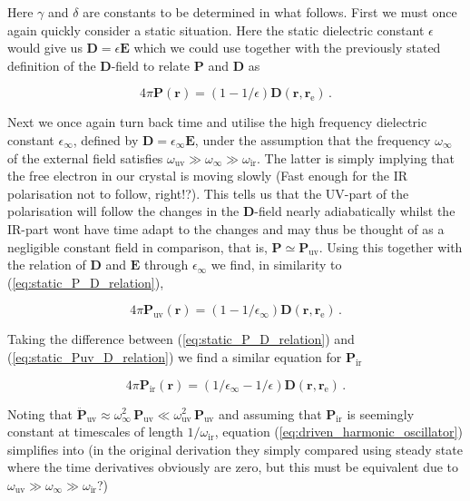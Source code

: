 \documentclass[12pt]{report}
\renewcommand{\vec}[1]{\boldsymbol{\mathbf{#1}}}                        %
\newcommand{\motivation}[1]{\textcolor{motivation}{#1}}
\begin{document}
Here $ \gamma $ and $ \delta $ are constants to be determined in what follows. First we must once again quickly consider a static situation. Here the static dielectric constant $ \epsilon $ would give us $ \vec D = \epsilon \vec E $ which we could use together with the previously stated definition of the $ \vec D $-field to relate $ \vec P $ and $ \vec D $ as

\begin{equation}
	\label{eq:static_P_D_relation}
	4 \pi \vec P(\vec r) = (1 - 1/\epsilon) \vec D(\vec r, \vec r_\text{e}) \,.
\end{equation}

Next we once again turn back time and utilise the high frequency dielectric constant $ \epsilon_\infty $, defined by $ \vec D = \epsilon_\infty \vec E $, under the assumption that the frequency $ \omega_\infty $ of the external field satisfies  $ \omega_\text{uv} \gg \omega_\infty \gg \omega_\text{ir} $. The latter is simply implying that the free electron in our crystal is moving slowly \motivation{(Fast enough for the IR polarisation not to follow, right!?)}. This tells us that the UV-part of the polarisation will follow the changes in the $ \vec D $-field nearly adiabatically whilst the IR-part wont have time adapt to the changes and may thus be thought of as a negligible constant field in comparison, that is, $ \vec P \simeq \vec P_\text{uv} $. Using this together with the relation of $ \vec D $ and $ \vec E $ through $ \epsilon_\infty $ we find, in similarity to (\ref{eq:static_P_D_relation}),

\begin{equation}
	\label{eq:static_Puv_D_relation}
	4 \pi \vec P_\text{uv} (\vec r) =  (1 - 1/\epsilon_\infty) \vec D(\vec r, \vec r_\text{e}) \,.
\end{equation}

Taking the difference between (\ref{eq:static_P_D_relation}) and (\ref{eq:static_Puv_D_relation}) we find a similar equation for $ \vec P_\text{ir} $

\begin{equation}
	\label{eq:static_Pir_D_relation}
	4 \pi \vec P_\text{ir} (\vec r) =  (1/\epsilon_\infty - 1/\epsilon) \vec D(\vec r, \vec r_\text{e}) \,.
\end{equation}

Noting that $ \ddot{\vec P}_\text{uv} \approx \omega_\infty^2 \, \vec P_\text{uv} \ll \omega_\text{uv}^2 \, \vec P_\text{uv} $ and assuming that $ \vec P_\text{ir} $ is seemingly constant at timescales of length $ 1/\omega_\text{ir} $, equation (\ref{eq:driven_harmonic_oscillator}) simplifies into \motivation{(in the original derivation they simply compared using steady state where the time derivatives obviously are zero, but this must be equivalent due to $ \omega_\text{uv} \gg \omega_\infty \gg \omega_\text{ir} $?)}
\end{document}

